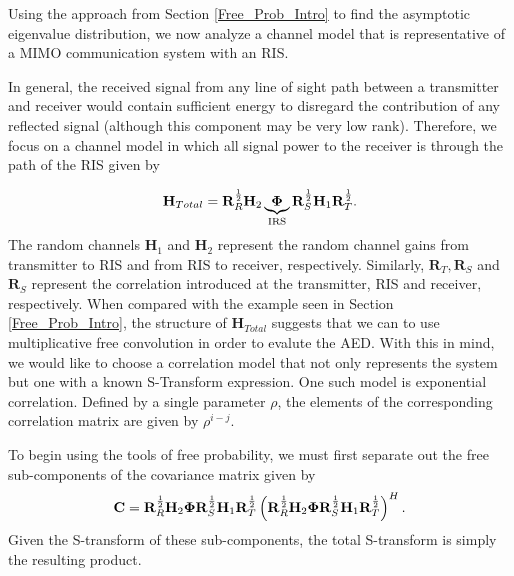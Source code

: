 Using the approach from Section \ref{Free_Prob_Intro} to find the asymptotic eigenvalue distribution, we now analyze a channel model that is representative of a MIMO communication system with an RIS. 
\par
In general, the received signal from any line of sight path between a transmitter and receiver would contain  sufficient energy to disregard the contribution of any reflected signal (although this component may be very low rank).  Therefore, we focus on a channel model in which all signal power to the receiver is through the path of the RIS  given by

	\begin{equation}\label{correlated_channel}
	\mathbf{H}_{Total} = \mathbf{R}_{R}^{\frac{1}{2}}\mathbf{H}_{2}\underbrace{\boldsymbol{\Phi}}_{\text{IRS}}\mathbf{R}_{S}^{\frac{1}{2}}\mathbf{H}_{1}\mathbf{R}_{T}^{\frac{1}{2}}.
	\end{equation}
The random channels $\mathbf{H}_{1}$ and $\mathbf{H}_{2}$ represent the random channel gains from transmitter to RIS and from RIS to receiver, respectively. Similarly, $ \mathbf{R}_{T},  \mathbf{R}_{S} $ and  $\mathbf{R}_{S}$ represent the correlation introduced at the transmitter, RIS and receiver, respectively. 
When compared with the example seen in Section \ref{Free_Prob_Intro}, the structure of $\mathbf{H}_{Total}$ suggests that we can to use multiplicative free convolution in order to evalute the AED. With this in mind, we would like to choose a correlation model  that not only represents the system but one with a known S-Transform expression. 
One such model is exponential correlation. Defined by a single parameter $\rho$, the elements of the corresponding correlation matrix are given by $\rho^{i-j}$.
\par
To begin using the tools of free probability, we must first separate out the free sub-components of the covariance matrix given by 
	\begin{equation}
	\mathbf{C} = \mathbf{R}_{R}^{\frac{1}{2}}\mathbf{H}_{2}\boldsymbol{\Phi} \mathbf{R}_{S}^{\frac{1}{2}}\mathbf{H}_{1}\mathbf{R}_{T}^{\frac{1}{2}}
	\left(\mathbf{R}_{R}^{\frac{1}{2}}\mathbf{H}_{2}\boldsymbol{\Phi} \mathbf{R}_{S}^{\frac{1}{2}}\mathbf{H}_{1}\mathbf{R}_{T}^{\frac{1}{2}}\right)^H.
	\end{equation}
Given the S-transform of these sub-components, the total S-transform is simply the resulting product.
